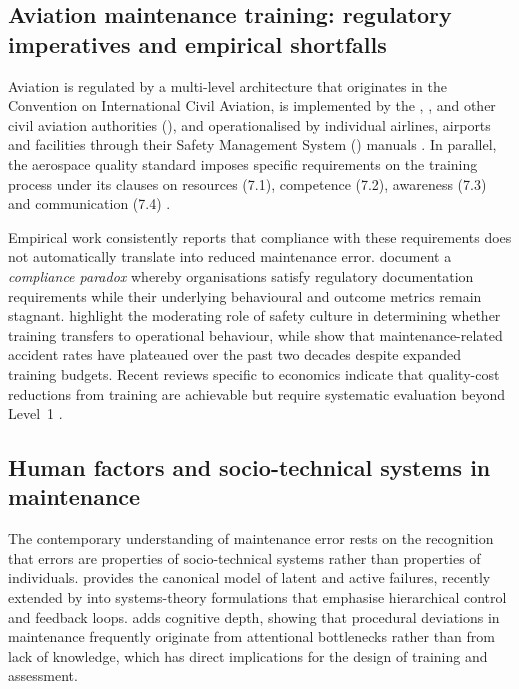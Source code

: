 \subsection{Aviation maintenance training: regulatory imperatives and empirical shortfalls}
\label{subsec:aviation-training}

Aviation \MRO{} is regulated by a multi-level architecture that originates in
the \ICAO{} Convention on International Civil Aviation, is implemented by the
\FAA{}, \EASA{}, \ANAC{} and other civil aviation authorities (\CAA{}), and
operationalised by individual airlines, airports and \MRO{} facilities
through their Safety Management System (\SMS{}) manuals
\citep{FAA2024,EASA2025}. In parallel, the aerospace quality standard
\AS{} imposes specific requirements on the training process under its
clauses on resources (7.1), competence (7.2), awareness (7.3) and
communication (7.4) \citep{Oschman2017}.

Empirical work consistently reports that compliance with these requirements
does not automatically translate into reduced maintenance error.
\citet{Nakamura2024} document a \emph{compliance paradox} whereby
organisations satisfy regulatory documentation requirements while their
underlying behavioural and outcome metrics remain stagnant.
\citet{ORconnor2024} highlight the moderating role of safety culture in
determining whether training transfers to operational behaviour, while
\citet{Boyd2015} show that maintenance-related accident rates have plateaued
over the past two decades despite expanded training budgets. Recent
reviews specific to \MRO{} economics indicate that quality-cost reductions
from training are achievable but require systematic evaluation beyond
Level~1 \citep{Zhang2025,Garcia2024}.

\subsection{Human factors and socio-technical systems in maintenance}
\label{subsec:human-factors}

The contemporary understanding of maintenance error rests on the recognition
that errors are properties of socio-technical systems rather than properties
of individuals. \citet{Reason2016} provides the canonical model of latent and
active failures, recently extended by \citet{Leveson2024} into systems-theory
formulations that emphasise hierarchical control and feedback loops.
\citet{Dismukes2023} adds cognitive depth, showing that procedural deviations
in maintenance frequently originate from attentional bottlenecks rather than
from lack of knowledge, which has direct implications for the design of
training and assessment.

